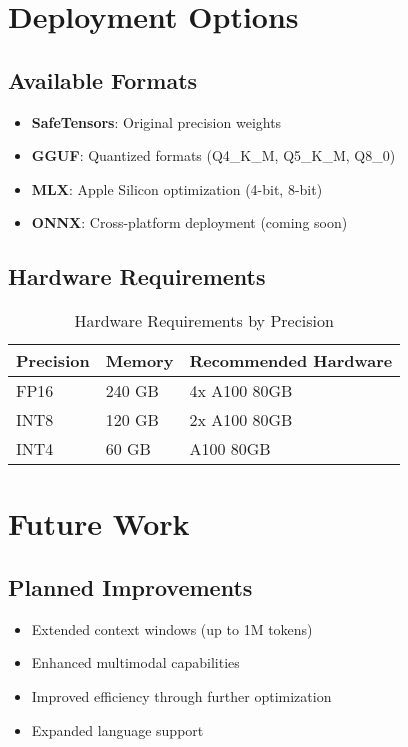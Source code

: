 \documentclass[11pt,a4paper]{article}
\begin{document}
\section{Deployment Options}

\subsection{Available Formats}
\begin{itemize}
    \item \textbf{SafeTensors}: Original precision weights
    \item \textbf{GGUF}: Quantized formats (Q4\_K\_M, Q5\_K\_M, Q8\_0)
    \item \textbf{MLX}: Apple Silicon optimization (4-bit, 8-bit)
    \item \textbf{ONNX}: Cross-platform deployment (coming soon)
\end{itemize}

\subsection{Hardware Requirements}
\begin{table}[H]
\centering
\begin{tabular}{lll}
\toprule
\textbf{Precision} & \textbf{Memory} & \textbf{Recommended Hardware} \\
\midrule
FP16 & 240 GB & 4x A100 80GB \\
INT8 & 120 GB & 2x A100 80GB \\
INT4 & 60 GB & A100 80GB \\
\bottomrule
\end{tabular}
\caption{Hardware Requirements by Precision}
\end{table}

\section{Future Work}

\subsection{Planned Improvements}
\begin{itemize}
    \item Extended context windows (up to 1M tokens)
    \item Enhanced multimodal capabilities
    \item Improved efficiency through further optimization
    \item Expanded language support
\end{itemize}
\end{document}
